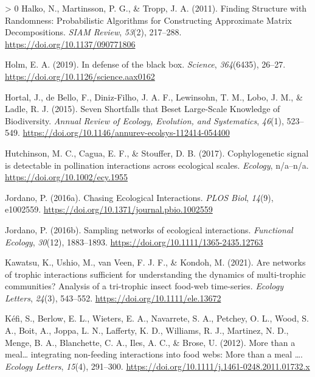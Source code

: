 \documentclass[11pt]{article}
\newlength{\cslhangindent}
\newenvironment{CSLReferences}[3] %
 {%
  \setlength{\parindent}{0pt}
  \ifodd #1 \everypar{\setlength{\hangindent}{\cslhangindent}}\ignorespaces\fi
  \ifnum #2 > 0
  \setlength{\parskip}{#2\baselineskip}
  \fi
 }%
 {}
\begin{document}
\begin{CSLReferences}{1}{0}
\leavevmode\hypertarget{ref-Halko2011FinStr}{}%
Halko, N., Martinsson, P. G., \& Tropp, J. A. (2011). Finding Structure
with Randomness: Probabilistic Algorithms for Constructing Approximate
Matrix Decompositions. \emph{SIAM Review}, \emph{53}(2), 217--288.
\url{https://doi.org/10.1137/090771806}

\leavevmode\hypertarget{ref-Holm2019DefBla}{}%
Holm, E. A. (2019). In defense of the black box. \emph{Science},
\emph{364}(6435), 26--27. \url{https://doi.org/10.1126/science.aax0162}

\leavevmode\hypertarget{ref-Hortal2015SevSho}{}%
Hortal, J., de Bello, F., Diniz-Filho, J. A. F., Lewinsohn, T. M., Lobo,
J. M., \& Ladle, R. J. (2015). Seven Shortfalls that Beset Large-Scale
Knowledge of Biodiversity. \emph{Annual Review of Ecology, Evolution,
and Systematics}, \emph{46}(1), 523--549.
\url{https://doi.org/10.1146/annurev-ecolsys-112414-054400}

\leavevmode\hypertarget{ref-Hutchinson2017CopSig}{}%
Hutchinson, M. C., Cagua, E. F., \& Stouffer, D. B. (2017).
Cophylogenetic signal is detectable in pollination interactions across
ecological scales. \emph{Ecology}, n/a--n/a.
\url{https://doi.org/10.1002/ecy.1955}

\leavevmode\hypertarget{ref-Jordano2016ChaEco}{}%
Jordano, P. (2016a). Chasing Ecological Interactions. \emph{PLOS Biol},
\emph{14}(9), e1002559.
\url{https://doi.org/10.1371/journal.pbio.1002559}

\leavevmode\hypertarget{ref-Jordano2016SamNet}{}%
Jordano, P. (2016b). Sampling networks of ecological interactions.
\emph{Functional Ecology}, \emph{30}(12), 1883--1893.
\url{https://doi.org/10.1111/1365-2435.12763}

\leavevmode\hypertarget{ref-Kawatsu2021AreNet}{}%
Kawatsu, K., Ushio, M., van Veen, F. J. F., \& Kondoh, M. (2021). Are
networks of trophic interactions sufficient for understanding the
dynamics of multi-trophic communities? Analysis of a tri-trophic insect
food-web time-series. \emph{Ecology Letters}, \emph{24}(3), 543--552.
\url{https://doi.org/10.1111/ele.13672}

\leavevmode\hypertarget{ref-Kefi2012MorMea}{}%
Kéfi, S., Berlow, E. L., Wieters, E. A., Navarrete, S. A., Petchey, O.
L., Wood, S. A., Boit, A., Joppa, L. N., Lafferty, K. D., Williams, R.
J., Martinez, N. D., Menge, B. A., Blanchette, C. A., Iles, A. C., \&
Brose, U. (2012). More than a meal\ldots{} integrating non-feeding
interactions into food webs: More than a meal \ldots. \emph{Ecology
Letters}, \emph{15}(4), 291--300.
\url{https://doi.org/10.1111/j.1461-0248.2011.01732.x}


\end{CSLReferences}
\end{document}
